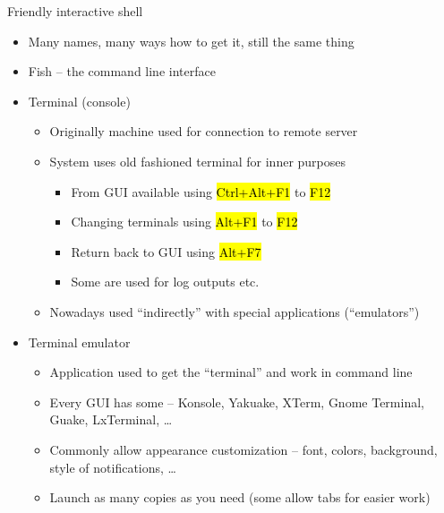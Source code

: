 \documentclass[compress, ucs, xelatex, 11pt, xcolor=svgnames,
  hyperref={
    bookmarks=true,
    unicode=true,
    colorlinks=true,
    pdftitle={Linux, command line and MetaCentrum},
    plainpages=false,
    pdfauthor={Vojtech Zeisek},
    pdfsubject={Course about use of Linux command line, writing shell scripts and using MetaCentrum of CESNET},
    pdfcreator={XeLaTeX},
    pdfkeywords={Linux, GNU, BASH, shell, command line, MetaCentrum},
    linkcolor=Red,
    anchorcolor=Blue,
    citecolor=Purple,
    filecolor=DodgerBlue,
    menucolor=DarkOrchid,
    urlcolor=DeepSkyBlue,
    pdftex},
  url={hyphens, lowtilde} %
  ]{beamer}
\renewcommand{\texttt}[1]{\hl{\ttfamily #1}}
\begin{document}
\begin{frame}{Friendly interactive shell}
\begin{itemize}
  \item Many names, many ways how to get it, still the same thing
  \item Fish -- the command line interface
  \item Terminal (console)
  \begin{itemize}
    \item Originally machine used for connection to remote server
    \item System uses old fashioned terminal for inner purposes
    \begin{itemize}
      \item From GUI available using \texttt{Ctrl+Alt+F1} to \texttt{F12}
      \item Changing terminals using \texttt{Alt+F1} to \texttt{F12}
      \item Return back to GUI using \texttt{Alt+F7}
      \item Some are used for log outputs etc.
    \end{itemize}
    \item Nowadays used ``indirectly'' with special applications (``emulators'')
  \end{itemize}
  \item Terminal emulator
  \begin{itemize}
    \item Application used to get the ``terminal'' and work in command line
    \item Every GUI has some -- Konsole, Yakuake, XTerm, Gnome Terminal, Guake, LxTerminal, \ldots
    \item Commonly allow appearance customization -- font, colors, background, style of notifications, \ldots
    \item Launch as many copies as you need (some allow tabs for easier work)
  \end{itemize}
\end{itemize}
\end{frame}
\end{document}
